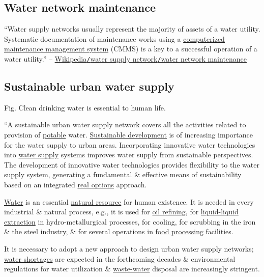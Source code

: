 \documentclass[oneside]{book}
\numberwithin{equation}{section}
\begin{document}
\subsection{Water network maintenance}
``Water supply networks usually represent the majority of assets of a water utility. Systematic documentation of maintenance works using a \href{https://en.wikipedia.org/wiki/Computerized_maintenance_management_system}{computerized maintenance management system} (CMMS) is a key to a successful operation of a water utility.'' -- \href{https://en.wikipedia.org/wiki/Water_supply_network#Water_network_maintenance}{Wikipedia\texttt{/}water supply network\texttt{/}water network maintenance}

\subsection{Sustainable urban water supply}
\textsf{Fig. Clean drinking water is essential to human life.}

``A sustainable urban water supply network covers all the activities related to provision of \href{https://en.wikipedia.org/wiki/Potable}{potable} water. \href{https://en.wikipedia.org/wiki/Sustainable_development}{Sustainable development} is of increasing importance for the water supply to urban areas. Incorporating innovative water technologies into \href{https://en.wikipedia.org/wiki/Water_supply}{water supply} systems improves water supply from sustainable perspectives. The development of innovative water technologies provides flexibility to the water supply system, generating a fundamental \& effective means of sustainability based on an integrated \href{https://en.wikipedia.org/wiki/Real_options}{real options} approach.

\href{https://en.wikipedia.org/wiki/Water}{Water} is an essential \href{https://en.wikipedia.org/wiki/Natural_resource}{natural resource} for human existence. It is needed in every industrial \& natural process, e.g., it is used for \href{https://en.wikipedia.org/wiki/Oil_refinery}{oil refining}, for \href{https://en.wikipedia.org/wiki/Liquid-liquid_extraction}{liquid-liquid extraction} in hydro-metallurgical processes, for cooling, for scrubbing in the iron \& the steel industry, \& for several operations in \href{https://en.wikipedia.org/wiki/Food_processing}{food processing} facilities.

It is necessary to adopt a new approach to design urban water supply networks; \href{https://en.wikipedia.org/wiki/Water_shortages}{water shortages} are expected in the forthcoming decades \& environmental regulations for water utilization \& \href{https://en.wikipedia.org/wiki/Waste-water}{waste-water} disposal are increasingly stringent.
\end{document}
